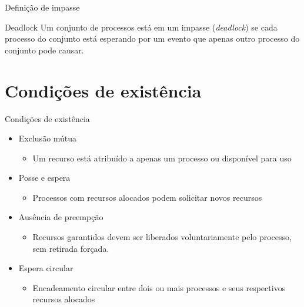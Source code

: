 \documentclass[aspectratio=169,
				xcolor=table]{beamer}
\begin{document}
	\begin{frame}{Definição de impasse}
		\begin{block}{Deadlock}
			Um conjunto de processos está em um impasse (\textit{deadlock}) se cada processo do conjunto está esperando por um evento que apenas outro processo do conjunto pode causar.
		\end{block}
	\end{frame}
	
	\section{Condições de existência}
	\begin{frame}{Condições de existência}
		\begin{itemize}
			\item Exclusão mútua
			\begin{itemize}
				\item Um recurso está atribuído a apenas um processo ou disponível para uso
			\end{itemize}
			\vspace{0.5em}
			\item Posse e espera
			\begin{itemize}
				\item Processos com recursos alocados podem solicitar novos recursos
			\end{itemize}
			\vspace{0.5em}
			\item Ausência de preempção
			\begin{itemize}
				\item Recursos garantidos devem ser liberados voluntariamente pelo processo, sem retirada forçada.
			\end{itemize}
			\vspace{0.5em}
			\item Espera circular
			\begin{itemize}
				\item Encadeamento circular entre dois ou mais processos e seus respectivos recursos alocados
			\end{itemize}
		\end{itemize}
	\end{frame}
	
\end{document}
